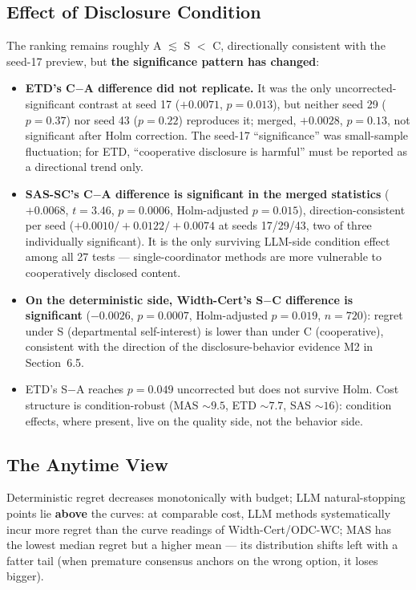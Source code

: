 \documentclass[letterpaper]{article}
\begin{document}
\subsection{Effect of Disclosure Condition}
The ranking remains roughly A $\lesssim$ S $<$ C, directionally consistent with the seed-17 preview, but \textbf{the significance pattern has changed}:
\begin{itemize}
\item \textbf{ETD's C$-$A difference did not replicate.} It was the only uncorrected-significant contrast at seed 17 ($+0.0071$, $p{=}0.013$), but neither seed 29 ($p{=}0.37$) nor seed 43 ($p{=}0.22$) reproduces it; merged, $+0.0028$, $p{=}0.13$, not significant after Holm correction. The seed-17 ``significance'' was small-sample fluctuation; for ETD, ``cooperative disclosure is harmful'' must be reported as a directional trend only.
\item \textbf{SAS-SC's C$-$A difference is significant in the merged statistics} ($+0.0068$, $t{=}3.46$, $p{=}0.0006$, Holm-adjusted $p{=}0.015$), direction-consistent per seed ($+0.0010/+0.0122/+0.0074$ at seeds 17/29/43, two of three individually significant). It is the only surviving LLM-side condition effect among all 27 tests --- single-coordinator methods are more vulnerable to cooperatively disclosed content.
\item \textbf{On the deterministic side, Width-Cert's S$-$C difference is significant} ($-0.0026$, $p{=}0.0007$, Holm-adjusted $p{=}0.019$, $n{=}720$): regret under S (departmental self-interest) is lower than under C (cooperative), consistent with the direction of the disclosure-behavior evidence M2 in Section~6.5.
\item ETD's S$-$A reaches $p{=}0.049$ uncorrected but does not survive Holm. Cost structure is condition-robust (MAS ${\sim}9.5$, ETD ${\sim}7.7$, SAS ${\sim}16$): condition effects, where present, live on the quality side, not the behavior side.
\end{itemize}

\subsection{The Anytime View}
Deterministic regret decreases monotonically with budget; LLM natural-stopping points lie \textbf{above} the curves: at comparable cost, LLM methods systematically incur more regret than the curve readings of Width-Cert/ODC-WC; MAS has the lowest median regret but a higher mean --- its distribution shifts left with a fatter tail (when premature consensus anchors on the wrong option, it loses bigger).
\end{document}
